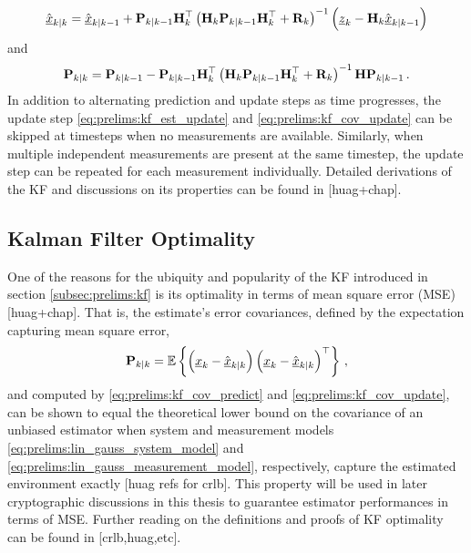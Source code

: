 \begin{equation}\label{eq:prelims:kf_est_update}
    \hat{{\underline{x}}}_{k|k} = \hat{{\underline{x}}}_{k|k-1}+{{\mathbf{P}}}_{k|k-1}{{\mathbf{H}}}_k^\top\left({{\mathbf{H}}}_k{{\mathbf{P}}}_{k|k-1}{{\mathbf{H}}}_k^\top + {{\mathbf{R}}}_k\right)^{-1}\left({\underline{z}}_k-{{\mathbf{H}}}_k\hat{{\underline{x}}}_{k|k-1}\right)
\end{equation}
and
\begin{equation}\label{eq:prelims:kf_cov_update}
    {\ensuremath{{\mathbf{P}}}}_{k|k} = {{\mathbf{P}}}_{k|k-1}-{{\mathbf{P}}}_{k|k-1}{{\mathbf{H}}}_k^\top\left({{\mathbf{H}}}_k{{\mathbf{P}}}_{k|k-1}{{\mathbf{H}}}_k^\top + {{\mathbf{R}}}_k\right)^{-1}{{\mathbf{H}}}{{\mathbf{P}}}_{k|k-1}\,.
\end{equation}
In addition to alternating prediction and update steps as time progresses, the update step \eqref{eq:prelims:kf_est_update} and \eqref{eq:prelims:kf_cov_update} can be skipped at timesteps when no measurements are available. Similarly, when multiple independent measurements are present at the same timestep, the update step can be repeated for each measurement individually. Detailed derivations of the KF and discussions on its properties can be found in [huag+chap].

% 
% 

\subsection{Kalman Filter Optimality}\label{subsec:prelims:kf_opt}
One of the reasons for the ubiquity and popularity of the KF introduced in section \ref{subsec:prelims:kf} is its optimality in terms of mean square error (MSE) [huag+chap]. That is, the estimate's error covariances, defined by the expectation capturing mean square error,
\begin{equation}
    {\ensuremath{{\mathbf{P}}}}_{k|k} = \mathbb{E}\left\{\left({\underline{x}}_k - \hat{{\underline{x}}}_{k|k}\right)\left({\underline{x}}_k - \hat{{\underline{x}}}_{k|k}\right)^\top\right\}\,,
\end{equation}
and computed by \eqref{eq:prelims:kf_cov_predict} and \eqref{eq:prelims:kf_cov_update}, can be shown to equal the theoretical lower bound on the covariance of an unbiased estimator when system and measurement models \eqref{eq:prelims:lin_gauss_system_model} and \eqref{eq:prelims:lin_gauss_measurement_model}, respectively, capture the estimated environment exactly [huag refs for crlb]. This property will be used in later cryptographic discussions in this thesis to guarantee estimator performances in terms of MSE. Further reading on the definitions and proofs of KF optimality can be found in [crlb,huag,etc].


